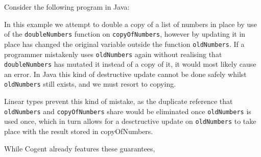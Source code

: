 Consider the following program in Java:



In this example we attempt to double a copy of a list of numbers in place by use of the \verb|doubleNumbers|
function on \verb|copyOfNumbers|, however by updating it in place has changed the original variable outside
the function \verb|oldNumbers|. If a programmer mistakenly uses \verb|oldNumbers| again without realising that
\verb|doubleNumbers| has mutated it instead of a copy of it, it would most likely cause an error. In 
Java this kind of destructive update cannot be done safely whilst \verb|oldNumbers| still exists, and we
must resort to copying.

Linear types prevent this kind of mistake, as the duplicate reference that
\verb|oldNumbers| and \verb|copyOfNumbers| share would be eliminated once \verb|oldNumbers| is used once,
which in turn allows for a desctructive update on \verb|oldNumbers| to take place with the result stored in
copyOfNumbers.

While Cogent already features these guarantees, 
